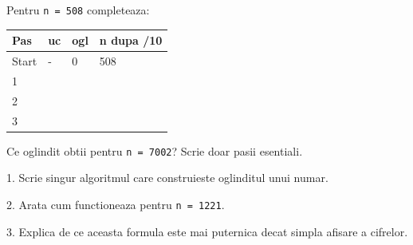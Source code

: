 \begin{solobox}
  Pentru \texttt{n = 508} completeaza:
  \begin{center}
  \begin{tabularx}{\linewidth}{|X|X|X|X|}
    \hline
    \textbf{Pas} & \textbf{uc} & \textbf{ogl} & \textbf{n dupa /10} \\
    \hline
    Start & - & 0 & 508 \\
    \hline
    1 & & & \\
    \hline
    2 & & & \\
    \hline
    3 & & & \\
    \hline
  \end{tabularx}
  \end{center}
\end{solobox}

\begin{solobox}
  Ce oglindit obtii pentru \texttt{n = 7002}? Scrie doar pasii esentiali.
\end{solobox}

\newpage
{}

\begin{solobox}
  1. Scrie singur algoritmul care construieste oglinditul unui numar.

  2. Arata cum functioneaza pentru \texttt{n = 1221}.

  3. Explica de ce aceasta formula este mai puternica decat simpla afisare a cifrelor.
\end{solobox}
